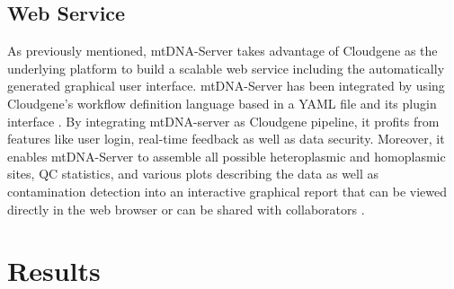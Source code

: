 \subsection{Web Service}
\label{webservice}
As previously mentioned, mtDNA-Server takes advantage of Cloudgene as the underlying platform to build a scalable web service including the automatically generated graphical user interface. mtDNA-Server has been integrated by using Cloudgene’s workflow definition language based in a YAML file and its plugin interface \cite{Schonherr2012, Weissensteiner2016b}. By integrating mtDNA-server as Cloudgene pipeline, it profits from features like user login, real-time feedback as well as data security. Moreover, it enables mtDNA-Server to assemble all possible heteroplasmic and homoplasmic sites, QC statistics, and various plots describing the data as well as contamination detection into an interactive graphical report that can be viewed directly in the web browser or can be shared with collaborators  \cite{Weissensteiner2016b}.
\section{Results}
